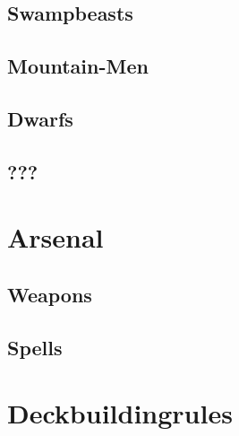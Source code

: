 \documentclass[a5paper,pagesize,10pt,bibtotoc,pointlessnumbers,
normalheadings,DIV=9,twoside=false]{scrbook}
\begin{document}
\section{Swampbeasts}

\section{Mountain-Men}

\section{Dwarfs}

\section{???}

\chapter{Arsenal}

\section{Weapons}

\section{Spells}

\chapter{Deckbuildingrules}
\end{document}
